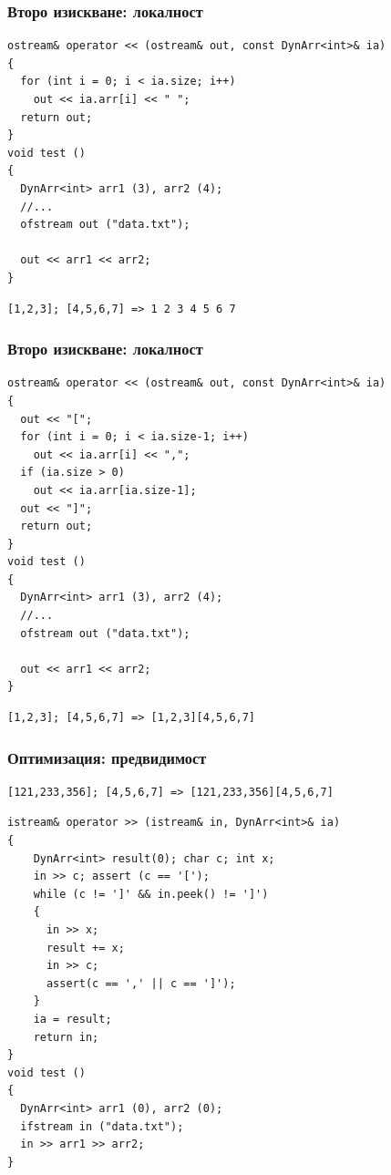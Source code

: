 \documentclass{beamer}
\begin{document}
\begin{frame}[fragile]
\frametitle{Второ изискване: локалност}

\begin{flushleft}
\begin{lstlisting}
ostream& operator << (ostream& out, const DynArr<int>& ia)
{
  for (int i = 0; i < ia.size; i++)
    out << ia.arr[i] << " ";
  return out;
}
void test ()
{
  DynArr<int> arr1 (3), arr2 (4);
  //...
  ofstream out ("data.txt");

  out << arr1 << arr2;
}
\end{lstlisting}
\end{flushleft}

\begin{lstlisting}
[1,2,3]; [4,5,6,7] => 1 2 3 4 5 6 7
\end{lstlisting}

\end{frame}


\begin{frame}[fragile]
\frametitle{Второ изискване: локалност}


\begin{flushleft}
\begin{lstlisting}
ostream& operator << (ostream& out, const DynArr<int>& ia)
{
  out << "[";
  for (int i = 0; i < ia.size-1; i++)
    out << ia.arr[i] << ",";
  if (ia.size > 0)
    out << ia.arr[ia.size-1];
  out << "]";
  return out;
}
void test ()
{
  DynArr<int> arr1 (3), arr2 (4);
  //...
  ofstream out ("data.txt");

  out << arr1 << arr2;
}
\end{lstlisting}
\end{flushleft}

\begin{lstlisting}
[1,2,3]; [4,5,6,7] => [1,2,3][4,5,6,7]
\end{lstlisting}

\end{frame}



\begin{frame}[fragile]
\frametitle{Оптимизация: предвидимост}

\begin{lstlisting}
[121,233,356]; [4,5,6,7] => [121,233,356][4,5,6,7]
\end{lstlisting}

\begin{flushleft}
\begin{lstlisting}
istream& operator >> (istream& in, DynArr<int>& ia)
{
    DynArr<int> result(0); char c; int x;
    in >> c; assert (c == '[');
    while (c != ']' && in.peek() != ']')
    {
      in >> x;
      result += x;
      in >> c;
      assert(c == ',' || c == ']');
    }
    ia = result;
    return in;
}
void test ()
{
  DynArr<int> arr1 (0), arr2 (0);
  ifstream in ("data.txt");
  in >> arr1 >> arr2;
}
\end{lstlisting}
\end{flushleft}


\end{frame}
\end{document}

